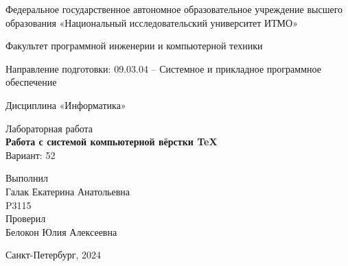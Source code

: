 \thispagestyle{empty}

\begin{center}
    Федеральное государственное автономное образовательное учреждение высшего образования «Национальный исследовательский университет ИТМО»

    \vspace{1em}
    Факультет программной инженерии и компьютерной техники

    \vspace{1em}
    Направление подготовки: 09.03.04 –
    Системное и прикладное программное обеспечение

    \vspace{1em}
    Дисциплина «Информатика»

    \vspace{18em}
    
    {\Large Лабораторная работа }\\[1em]
    {\Large \textbf{Работа с системой компьютерной вёрстки \TeX}}\\[1em]
    Вариант: 52
\end{center}

\vspace{12em}

\begin{flushright}
    Выполнил\\
    Галак Екатерина Анатольевна\\
    P3115\\
    Проверил\\
    Белокон Юлия Алексеевна
\end{flushright}

\vspace{\fill}

\begin{center}
Санкт-Петербург, 2024
\end{center}